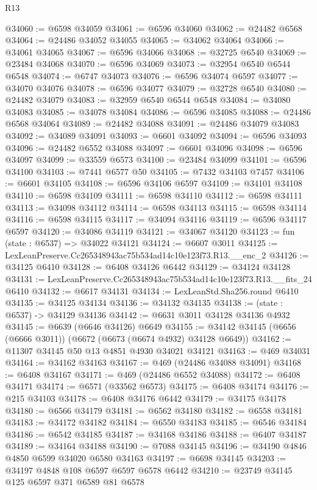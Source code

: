 \begin{lexlean}{R13}
\begin{coremodule}
@34060 := @6598 @34059
@34061 := @6596 @34060
@34062 := @24482 @6568
@34064 := @24486 @34052 @34055
@34065 := @34062 @34064
@34066 := @34061 @34065
@34067 := @6596 @34066
@34068 := @32725 @6540
@34069 := @23484 @34068
@34070 := @6596 @34069
@34073 := @32954 @6540 @6544 @6548
@34074 := @6747 @34073
@34076 := @6596 @34074 @6597
@34077 := @34070 @34076
@34078 := @6596 @34077
@34079 := @32728 @6540
@34080 := @24482 @34079
@34083 := @32959 @6540 @6544 @6548
@34084 := @34080 @34083
@34085 := @34078 @34084
@34086 := @6596 @34085
@34088 := @24486 @6568 @34064
@34089 := @24482 @34088
@34091 := @24486 @34079 @34083
@34092 := @34089 @34091
@34093 := @6601 @34092
@34094 := @6596 @34093
@34096 := @24482 @6552 @34088
@34097 := @6601 @34096
@34098 := @6596 @34097
@34099 := @33559 @6573
@34100 := @23484 @34099
@34101 := @6596 @34100
@34103 := @7441 @6577 @50
@34105 := @7432 @34103 @7457
@34106 := @6601 @34105
@34108 := @6596 @34106 @6597
@34109 := @34101 @34108
@34110 := @6598 @34109
@34111 := @6598 @34110
@34112 := @6598 @34111
@34113 := @34098 @34112
@34114 := @6598 @34113
@34115 := @6598 @34114
@34116 := @6598 @34115
@34117 := @34094 @34116
@34119 := @6596 @34117 @6597
@34120 := @34086 @34119
@34121 := @34067 @34120
@34123 := fun (state : @6537) => @34022 @34121
@34124 := @6607 @3011
@34125 := LexLeanPreserve.Cc265348943ac75b534ad14c10e123f73.R13.__enc_2
@34126 := @34125 @6410
@34128 := @6408 @34126 @6442
@34129 := @34124 @34128
@34131 := LexLeanPreserve.Cc265348943ac75b534ad14c10e123f73.R13.__fits_24 @6410
@34132 := @6617 @34131
@34134 := LexLeanStd.Sha256.round @6410
@34135 := @34125 @34134
@34136 := @34132 @34135
@34138 := (state : @6537) -> @34129 @34136
@34142 := @6631 @3011 @34128 @34136 @4932
@34145 := @6639 (@6646 @34126) @6649
@34155 := @34142 @34145 (@6656 (@6666 @3011)) (@6672 (@6673 (@6674 @4932) @34128 @6649))
@34162 := @11307 @34145 @50 @13 @4851 @4930 @34021 @34121
@34163 := @469 @34031
@34164 := @34162 @34163
@34167 := @469 (@24486 @34088 @34091)
@34168 := @6408 @34167
@34171 := @469 (@24486 @6552 @34088)
@34172 := @6408 @34171
@34174 := @6571 (@33562 @6573)
@34175 := @6408 @34174
@34176 := @215 @34103
@34178 := @6408 @34176 @6442
@34179 := @34175 @34178
@34180 := @6566 @34179
@34181 := @6562 @34180
@34182 := @6558 @34181
@34183 := @34172 @34182
@34184 := @6550 @34183
@34185 := @6546 @34184
@34186 := @6542 @34185
@34187 := @34168 @34186
@34188 := @6407 @34187
@34189 := @34164 @34188
@34190 := @7088 @34145
@34196 := @34190 @4846 @4850 @6599 @34020 @6580 @34163
@34197 := @6698 @34145
@34203 := @34197 @4848 @108 @6597 @6597 @6578 @6442
@34210 := @23749 @34145 @125 @6597 @371 @6589 @81 @6578

\end{coremodule}
\end{lexlean}

